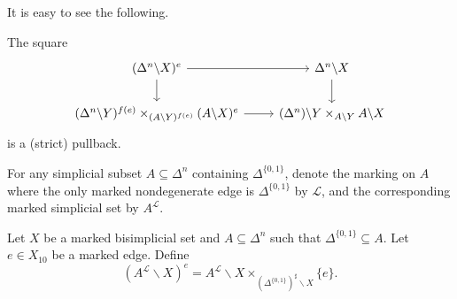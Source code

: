 \documentclass[main.tex]{subfiles}
\begin{document}
It is easy to see the following.
\begin{lemma}
  \label{lemma:unmarked_pullback}
  The square
  \begin{equation*}
    \begin{tikzcd}
      (\Delta^{n} \backslash X)^{e}
      \arrow[r]
      \arrow[d]
      & \Delta^{n} \backslash X
      \arrow[d]
      \\
      (\Delta^{n} \backslash Y)^{f(e)} \times_{(A \backslash Y)^{f(e)}} (A \backslash X)^{e}
      \arrow[r]
      & (\Delta^{n}) \backslash Y \times_{A\backslash Y} A \backslash X
    \end{tikzcd}
  \end{equation*}
  is a (strict) pullback.
\end{lemma}

\begin{definition}
  For any simplicial subset $A \subseteq \Delta^{n}$ containing $\Delta^{\{0, 1\}}$, denote the marking on $A$ where the only marked nondegenerate edge is $\Delta^{\{0, 1\}}$ by $\mathcal{L}$, and the corresponding marked simplicial set by $A^{\mathcal{L}}$.
\end{definition}

\begin{notation}
  Let $X$ be a marked bisimplicial set and $A \subseteq \Delta^{n}$ such that $\Delta^{\{0, 1\}} \subseteq A$. Let $e \in X_{10}$ be a marked edge. Define
  \begin{equation*}
    (A^{\mathcal{L}} \backslash X)^{e} = A^{\mathcal{L}} \backslash X \times_{(\Delta^{\{0, 1\}})^{\sharp} \backslash X} \{e\}.
  \end{equation*}
\end{notation}
\end{document}
